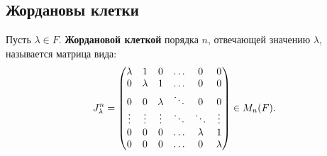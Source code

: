 \subsection{Жордановы клетки}
\begin{Def}
Пусть $\lambda \in F$. \textbf{Жордановой клеткой} порядка $n$, отвечающей значению $\lambda$, называется матрица вида:
\begin{gather*}
J_\lambda^n = 
\begin{pmatrix}
\lambda & 1 & 0 & \ldots & 0 & 0 \\
0 & \lambda & 1 & \ldots & 0 & 0 \\
0 & 0 & \lambda & \ddots & 0 & 0 \\
\vdots & \vdots & \vdots & \ddots & \ddots & \vdots \\
0 & 0 & 0 & \ldots & \lambda & 1 \\
0 & 0 & 0 & \ldots & 0 & \lambda
\end{pmatrix} \in M_n(F).
\end{gather*}
\end{Def}


